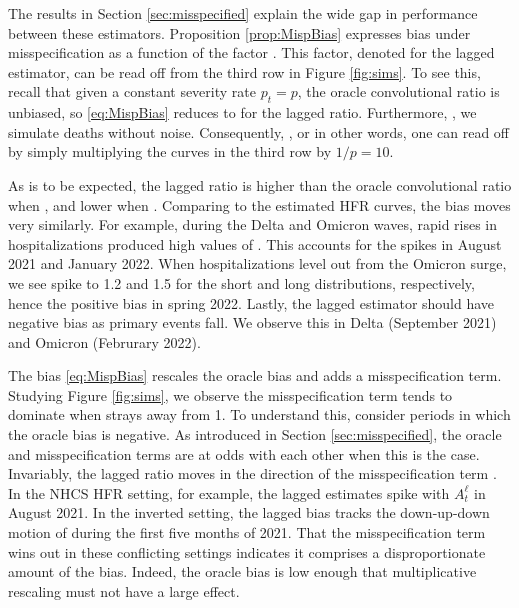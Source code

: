\documentclass{article}
\renewcommand{\hat}{\widehat} %
\newcommand{\given}{\, \vert \,}
\begin{document}
The results in Section \ref{sec:misspecified} explain the wide
gap in performance between these estimators. Proposition \ref{prop:MispBias} 
expresses bias under misspecification as a function of the factor
. This factor, denoted  for the lagged
estimator, can be read off from the third row in Figure \ref{fig:sims}. To see
this, recall that given a constant severity rate $p_t = p$, the oracle
convolutional ratio is unbiased, so \eqref{eq:MispBias} reduces to
\smash{$\E[\hat{p}_t^\ell \given \{X_s\}_{s\leq t}] = p A_t^\ell$} for the
lagged ratio. Furthermore, \smash{$\E[\hat{p}_t^\ell \given \{X_s\}_{s\leq t}]  
  = \hat{p}_t^\ell$}, we simulate deaths without noise. Consequently,
\smash{$A_t^\ell = \hat{p}_t^\ell / p$}, or in other words, one can read off 
 by simply multiplying the curves in the third row by $1/p =
10$.   

As is to be expected, the lagged ratio is higher than the oracle convolutional
ratio when , and lower when . Comparing  to the estimated HFR curves, the bias moves
very similarly. For example, during the Delta and Omicron waves, rapid rises in
hospitalizations produced high values of . This accounts for
the spikes in August 2021 and January 2022. When hospitalizations level out from
the Omicron surge, we see  spike to 1.2 and 1.5 for the short
and long distributions, respectively, hence the positive bias in spring 2022.
Lastly, the lagged estimator should have negative bias as primary events
fall. We observe  this in Delta (September 2021) and Omicron (Februrary 2022).  

The bias \eqref{eq:MispBias} rescales the oracle bias and adds a
misspecification term. Studying Figure \ref{fig:sims}, we observe the
misspecification term tends to dominate when  strays away from 
1. To understand this, consider periods in which the oracle bias is negative. As
introduced in Section \ref{sec:misspecified}, the oracle and misspecification
terms are at odds with each other when this is the case. Invariably, the lagged
ratio moves in the direction of the misspecification term
. In the NHCS HFR setting, for example, the lagged 
estimates spike with $A_t^\ell$ in August 2021. In the inverted setting, the 
lagged bias tracks the down-up-down motion of  during the
first five months of 2021. That the misspecification term wins out in these
conflicting settings indicates it comprises a disproportionate amount of the
bias. Indeed, the oracle bias is low enough that multiplicative rescaling must 
not have a large effect.  
\end{document}

